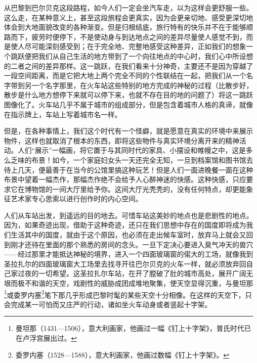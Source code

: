\par 从巴黎到巴尔贝克这段路程，如今人们一定会坐汽车走，以为这样会更舒服一些。这么走，在某种意义上，甚至这段旅程会更真实，因为会更亲切地、感受更深切地体会到大地面貌改变的各种渐变。但是归根结底，旅行特有的快乐并不在于能够顺路而下，疲劳时便停下，不是使动身与到达地点之间的差异尽量使人感觉不到，而是使人尽可能深刻感受到；在于完全地、完整地感受这种差异，正如我们的想象一个跳跃便把我们从自己生活的地方带到了一个向往地点的中心时，我们心中所设想的二者之间的差异那样。这一跳跃，在我们看来十分神奇，主要还不是因为穿越了一段空间距离，而是它把大地上两个完全不同的个性联结在一起，把我们从一个名字带到另一个名字那里，在火车站这些特别的地方完成的神秘的过程（比散步好，散步是什么地方想停下来就可以停下来，也就不存在目的地的问题了）将这一跳跃图像化了。火车站几乎不属于城市的组成部分，但是包含着城市人格的真谛，就像在指示牌上，车站上写着城市名一样。
\par 但是，在各种事情上，我们这个时代有一个怪癖，就是愿意在真实的环境中来展示物件，这样也就取消了根本的东西，即将这些物件与真实环境分离开来的精神活动。人们“展示”一幅画，将它置于与其同时代的家具、小摆设和帷幔之中，这是多么乏味的布景！如今，一个家庭妇女头一天还完全无知，一旦到档案馆和图书馆去待上几天，便最善于在当今的公馆里搞这种玩艺！但是人们一面进晚餐一面在这种布景中望着一幅杰作，那幅杰作绝不会给予人心醉神迷的快感。这种快感，只应要求它在博物馆的一间大厅里给予你。这间大厅光秃秃的，没有任何特点，却更能象征艺术家专心思索以进行创作时的内心空间。
\par 人们从车站出发，到遥远的目的地去。可惜车站这美妙的地点也是悲剧性的地点。因为，如果奇迹出现，借助于这种奇迹，还只在我们思想中存在的国度即将成为我们生活其中的国度，就由于这个原因，也必须在走出候车室时，放弃马上就会又回到刚才还待在里面的那个熟悉的房间的念头。一旦下定决心要进入臭气冲天的兽穴——经过那里才能抵达神秘的境界，进入一个四面玻璃窗的偌大的工场，就像我到圣拉扎尔的四面玻璃窗大工场里去找寻开往巴尔贝克的火车一样，就必须放弃回自己家过夜的一切希望。这圣拉扎尔车站，在开了膛破了肚的城市高处，展开广阔无垠而极不和谐的天空，戏剧性的威胁成团成堆地聚集，使天空显得沉重，与曼坦那\footnote{曼坦那（1431—1506），意大利画家，他画过一幅《钉上十字架》，普氏时代已在卢浮宫展出过。}或委罗内塞\footnote{委罗内塞（1528—1588），意大利画家，他画过数幅《钉上十字架》。}笔下那几乎形成巴黎时髦的某些天空十分相像。在这样的天空下，只会完成某一可怕而又庄严的行动，诸如坐火车动身或者竖起十字架。
